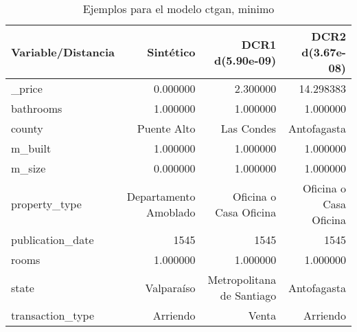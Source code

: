 \begin{table}[H]
\centering
\fontsize{10}{14}\selectfont
\caption{Ejemplos para el modelo ctgan, minimo}
\label{table-example-economicos-a-2-ctgan-min}
\begin{tabular}{|l|r|r|r|}
\hline
\rowcolor[gray]{0.8}
Variable/Distancia & Sintético & DCR1 d(5.90e-09) & DCR2 d(3.67e-08) \\
\hline \_price & \cellcolor[rgb]{0.9, 0.54, 0.52} 0.000000 & 2.300000 & 14.298383 \\
\hline bathrooms & \cellcolor[rgb]{0.9, 0.54, 0.52} 1.000000 & \cellcolor[rgb]{0.9, 0.54, 0.52} 1.000000 & \cellcolor[rgb]{0.9, 0.54, 0.52} 1.000000 \\
\hline county & \cellcolor[rgb]{0.9, 0.54, 0.52} Puente Alto & Las Condes & Antofagasta \\
\hline m\_built & \cellcolor[rgb]{0.9, 0.54, 0.52} 1.000000 & \cellcolor[rgb]{0.9, 0.54, 0.52} 1.000000 & \cellcolor[rgb]{0.9, 0.54, 0.52} 1.000000 \\
\hline m\_size & \cellcolor[rgb]{0.9, 0.54, 0.52} 0.000000 & 1.000000 & 1.000000 \\
\hline property\_type & \cellcolor[rgb]{0.9, 0.54, 0.52} Departamento Amoblado & Oficina o Casa Oficina & Oficina o Casa Oficina \\
\hline publication\_date & \cellcolor[rgb]{0.9, 0.54, 0.52} 1545 & \cellcolor[rgb]{0.9, 0.54, 0.52} 1545 & \cellcolor[rgb]{0.9, 0.54, 0.52} 1545 \\
\hline rooms & \cellcolor[rgb]{0.9, 0.54, 0.52} 1.000000 & \cellcolor[rgb]{0.9, 0.54, 0.52} 1.000000 & \cellcolor[rgb]{0.9, 0.54, 0.52} 1.000000 \\
\hline state & \cellcolor[rgb]{0.9, 0.54, 0.52} Valparaíso & Metropolitana de Santiago & Antofagasta \\
\hline transaction\_type & \cellcolor[rgb]{0.9, 0.54, 0.52} Arriendo & Venta & \cellcolor[rgb]{0.9, 0.54, 0.52} Arriendo \\
\hline
\end{tabular}
\end{table}
